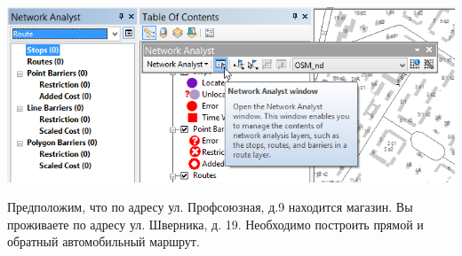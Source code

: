 \documentclass[]{book}
\theoremstyle{definition}
\theoremstyle{definition}
\theoremstyle{definition}
\theoremstyle{remark}
\begin{document}
\begin{enumerate}
  \includegraphics{images/Ex12/image9.png}
\end{enumerate}

Предположим, что по адресу ул. Профсоюзная, д.9 находится магазин. Вы
проживаете по адресу ул. Шверника, д. 19. Необходимо построить прямой и
обратный автомобильный маршрут.
\end{document}
